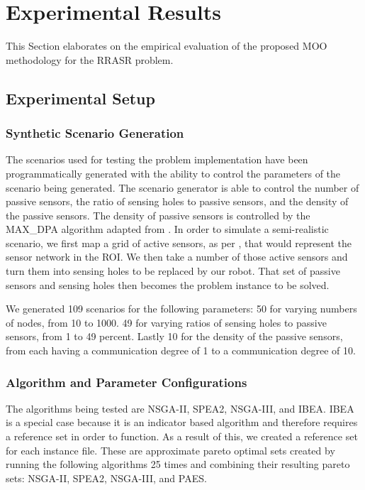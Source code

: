 \documentclass[conference]{IEEEtran}
\begin{document}

\section{Experimental Results}
\label{sec:Experiments}

This Section elaborates on the empirical evaluation of the proposed MOO methodology for the RRASR problem.

\subsection{Experimental Setup}
\label{sec:Experiments:Setup:Scenarios}

\subsubsection{Synthetic Scenario Generation}
\label{sec:Experiments:Scenarios}

The scenarios used for testing the problem implementation have been programmatically generated with the ability to control the parameters of the scenario being generated. The scenario generator is able to control the number of passive sensors, the ratio of sensing holes to passive sensors, and the density of the passive sensors. The density of passive sensors is controlled by the  MAX\_DPA algorithm adapted from \cite{onat2008generating}. In order to simulate a semi-realistic scenario, we first map a grid of active sensors, as per \cite{fletcher2010back}\cite{li2014placing}, that would represent the sensor network in the ROI. We then take a number of those active sensors and turn them into sensing holes to be replaced by our robot. That set of passive sensors and sensing holes then becomes the problem instance to be solved.

We generated 109 scenarios for the following parameters: 50 for varying numbers of nodes, from 10 to 1000. 49 for varying ratios of sensing holes to passive sensors, from 1 to 49 percent. Lastly 10 for the density of the passive sensors, from each having a communication degree of 1 to a communication degree of 10.

\subsubsection{Algorithm and Parameter Configurations}
\label{sec:Simulations:AlgorithmsAndParameters}
The algorithms being tested are NSGA-II\cite{Deb2002:NSGA-II}, SPEA2\cite{zitzler2001spea2}, NSGA-III\cite{6600851}, and IBEA\cite{zitzler2004indicator}. IBEA is a special case because it is an indicator based algorithm and therefore requires a reference set in order to function. As a result of this, we created a reference set for each instance file. These are approximate pareto optimal sets created by running the following algorithms 25 times and combining their resulting pareto sets: NSGA-II, SPEA2,  NSGA-III, and PAES\cite{knowles2000approximating}.
\end{document}
